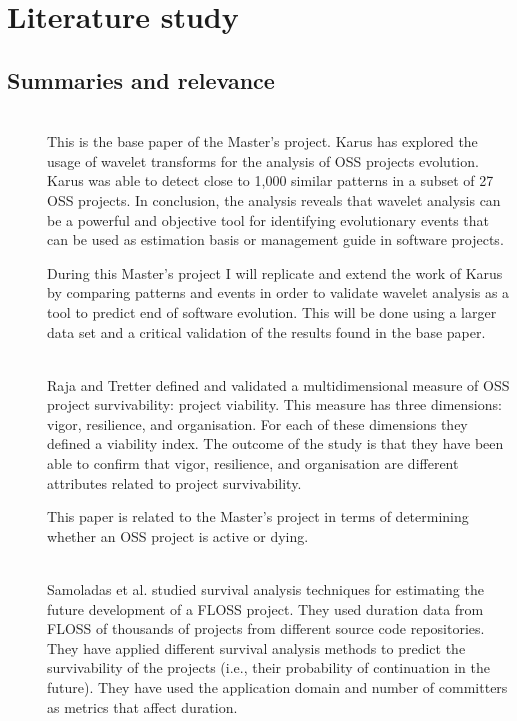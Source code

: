 \section{Literature study}

\subsection{Summaries and relevance}

\begin{description}
	\item[\cite{karus2013}] \hfill \\
		This is the base paper of the Master's project.
		Karus has explored the usage of wavelet transforms for the analysis of OSS
		projects evolution. Karus was able to detect close to 1,000 similar patterns
		in a subset of 27 OSS projects. In conclusion, the analysis reveals that
		wavelet analysis can be a powerful and objective tool for identifying
		evolutionary events that can be used as estimation basis or management guide
		in software projects.

		During this Master's project I will replicate and extend the work of Karus by
		comparing patterns and events in order to validate wavelet analysis as a tool
		to predict end of software evolution. This will be done using a larger data
		set and a critical validation of the results found in the base paper.

	\item[\cite{raja2012}] \hfill \\
		Raja and Tretter defined and validated a multidimensional measure of OSS
		project survivability: project viability. This measure has three dimensions:
		vigor, resilience, and organisation. For each of these dimensions they defined
		a viability index. The outcome of the study is that they have been able to
		confirm that vigor, resilience, and organisation are different attributes
		related to project survivability.

		This paper is related to the Master's project in terms of determining whether
		an OSS project is active or dying.

	\item[\cite{samoladas2010}] \hfill \\
		Samoladas et al. studied survival analysis techniques for estimating the
		future development of a FLOSS project. They used duration data from
		FLOSS of thousands of projects from different source code repositories. They
		have applied different survival analysis methods to predict the survivability
		of the projects (i.e., their probability of continuation in the future). They
		have used the application domain and number of committers as metrics that
		affect duration.


\end{description}
